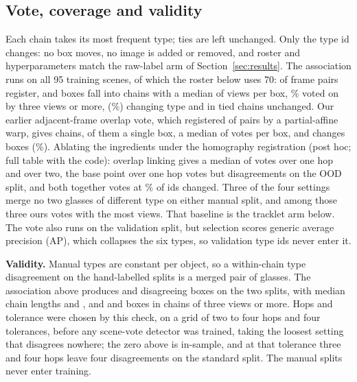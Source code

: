 \documentclass{article}
\begin{document}
\subsection{Vote, coverage and validity}
\label{sec:vote}
Each chain takes its most frequent type; ties are left unchanged. Only the type id changes: no box moves, no image is added or removed, and roster and hyperparameters match the raw-label arm of Section~\ref{sec:results}. The association runs on all 95 training scenes, of which the roster below uses 70: \SceneRegPairs{} of \SceneTriedPairs{} frame pairs register, and \ChainBoxes{} boxes fall into \SceneChains{} chains with a median of \SceneMedianLen{} views per box, \SceneBoxesGeThreePct\% voted on by three views or more, \SceneChanged{} (\SceneChangedPct\%) changing type and \SceneTied{} in tied chains unchanged. Our earlier adjacent-frame overlap vote, which registered \ChainFramePairsReg{} of \AdjFramePairs{} pairs by a partial-affine warp, gives \TrkChains{} chains, \TrkSingletons{} of them a single box, a median of \TrkMedianVotes{} votes per box, and changes \TrkChanged{} boxes (\TrkChangedPct\%). Ablating the ingredients under the homography registration (post hoc; full table with the code): overlap linking gives a median of \AblOvOneVotes{} votes over one hop and \AblOvTwoVotes{} over two, the base point over one hop \AblBaseOneVotes{} votes but \AblBaseOneOODDis{} disagreements on the OOD split, and both together \SceneMedianLen{} votes at \SceneChangedPct\% of ids changed. Three of the four settings merge no two glasses of different type on either manual split, and among those three ours votes with the most views. That baseline is the tracklet arm below. The vote also runs on the validation split, but selection scores generic average precision (AP), which collapses the six types, so validation type ids never enter it.

\noindent\textbf{Validity.} Manual types are constant per object, so a within-chain type disagreement on the hand-labelled splits is a merged pair of glasses. The association above produces \ManualChainStd{} and \ManualChainOOD{} disagreeing boxes on the two splits, with median chain lengths \ManualMedianStd{} and \ManualMedianOOD, and \ManualGeThreeStd{} and \ManualGeThreeOOD{} boxes in chains of three views or more. Hops and tolerance were chosen by this check, on a grid of two to four hops and four tolerances, before any scene-vote detector was trained, taking the loosest setting that disagrees nowhere; the zero above is in-sample, and at that tolerance three and four hops leave four disagreements on the standard split. The manual splits never enter training.
\end{document}
